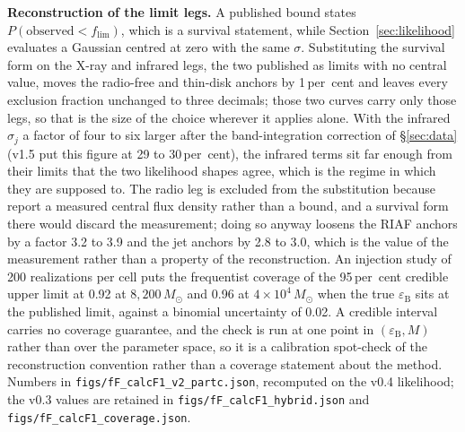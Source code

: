 \documentclass[11pt]{article}
\newcommand{\msun}{\ensuremath{M_\odot}}
\newcommand{\eps}{\ensuremath{\varepsilon_{\mathrm{B}}}}
\begin{document}
\textbf{Reconstruction of the limit legs.} A published bound states
$P(\text{observed} < f_{\mathrm{lim}})$, which is a survival statement, while
Section~\ref{sec:likelihood} evaluates a Gaussian centred at zero with the same
$\sigma$. Substituting the survival form on the X-ray and infrared legs, the two
published as limits with no central value, moves the radio-free and thin-disk
anchors by 1\,per~cent and leaves every exclusion fraction unchanged to three
decimals; those two curves carry only those legs, so that is the size of the
choice wherever it applies alone. With the infrared $\sigma_{j}$ a factor of four to six larger after the band-integration
correction of \S\ref{sec:data} (v1.5 put this figure at 29 to 30\,per~cent), the
infrared terms sit far enough from their limits that the two likelihood
shapes agree, which is the regime in which they are supposed to. The radio leg
is excluded from the substitution because \citet{Mahida2026} report a measured
central flux density rather than a bound, and a survival form there would
discard the measurement; doing so anyway loosens the RIAF anchors by a factor
3.2 to 3.9 and the jet anchors by 2.8 to 3.0, which is the value of the
measurement rather than a property of the reconstruction. An injection study
of 200 realizations per cell puts the frequentist coverage of the 95\,per~cent
credible upper limit at 0.92 at $8{,}200\,\msun$ and 0.96 at
$4\times10^{4}\,\msun$ when the true $\eps$ sits at the published limit, against
a binomial uncertainty of 0.02. A credible interval carries no coverage
guarantee, and the check is run at one point in $(\eps, M)$ rather than over the
parameter space, so it is a calibration spot-check of the reconstruction
convention rather than a coverage statement about the method. Numbers in
\texttt{figs/fF\_calcF1\_v2\_partc.json}, recomputed on the v0.4 likelihood;
the v0.3 values are retained in \texttt{figs/fF\_calcF1\_hybrid.json} and
\texttt{figs/fF\_calcF1\_coverage.json}.
\end{document}
